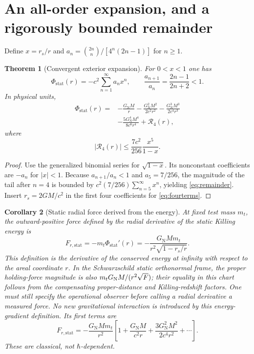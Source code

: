 \documentclass[11pt,a4paper,oneside]{report}
\numberwithin{equation}{chapter}
\newtheorem{theorem}{Theorem}[chapter]
\newtheorem{corollary}[theorem]{Corollary}
\theoremstyle{definition}\newtheorem{definition}[theorem]{Definition}
\theoremstyle{remark}\newtheorem{remark}[theorem]{Remark}
\newcommand{\Phist}{\Phi_{\mathrm{stat}}}
\newcommand{\GNewton}{G_{\mathrm N}}
\begin{document}
\section{An all-order expansion, and a rigorously bounded remainder}\label{sec:series}
Define $x=r_s/r$ and $a_n=\binom{2n}{n}/[4^n(2n-1)]$ for $n\ge1$.
\begin{theorem}[Convergent exterior expansion]\label{thm:series}
For $0<x<1$ one has
\begin{equation}
 \boxed{\displaystyle\Phist(r)=-c^2\sum_{n=1}^\infty a_nx^n},
 \qquad \frac{a_{n+1}}{a_n}=\frac{2n-1}{2n+2}<1.
 \label{eq:allorder}
\end{equation}
In physical units,
\begin{equation}
 \boxed{\begin{aligned}
 \Phist(r)={}&-\frac{\GNewton M}{r}
 -\frac{\GNewton^2M^2}{2c^2r^2}
 -\frac{\GNewton^3M^3}{2c^4r^3}\\
 &-\frac{5\GNewton^4M^4}{8c^6r^4}+\mathcal R_4(r),
 \end{aligned}}
 \label{eq:fourterms}
\end{equation}
where
\begin{equation}
 \boxed{\displaystyle |\mathcal R_4(r)|\leq
 \frac{7c^2}{256}\frac{x^5}{1-x}.}
 \label{eq:remainder}
\end{equation}
\end{theorem}
\begin{proof}
Use the generalized binomial series for $\sqrt{1-x}$. Its nonconstant coefficients are $-a_n$ for $|x|<1$. Because $a_{n+1}/a_n<1$ and $a_5=7/256$, the magnitude of the tail after $n=4$ is bounded by $c^2(7/256)\sum_{n=5}^\infty x^n$, yielding \eqref{eq:remainder}. Insert $r_s=2GM/c^2$ in the first four coefficients for \eqref{eq:fourterms}.
\end{proof}

\begin{corollary}[Static radial force derived from the energy]\label{cor:force}
At fixed test mass $m_t$, the outward-positive force defined by the radial derivative of the static Killing energy is
\begin{equation}
 \boxed{\displaystyle
 F_{r,\mathrm{stat}}=-m_t\Phist'(r)
 =-\frac{\GNewton M m_t}{r^2\sqrt{1-r_s/r}}.}
 \label{eq:staticforce}
\end{equation}
This definition is the derivative of the conserved energy at infinity
with respect to the areal coordinate $r$.  In the Schwarzschild static
orthonormal frame, the proper holding-force magnitude is also
$m_tG_{\rm N}M/(r^2\sqrt F)$; their equality in this chart follows from
the compensating proper-distance and Killing-redshift factors.  One must
still specify the operational observer before calling a radial derivative
a measured force.  No new gravitational interaction is introduced by this
energy-gradient definition.
Its first terms are
\begin{equation}
 F_{r,\mathrm{stat}}=-\frac{\GNewton M m_t}{r^2}
 \left[1+\frac{\GNewton M}{c^2r}
 +\frac{3\GNewton^2M^2}{2c^4r^2}+\cdots\right].
\end{equation}
These are classical, not $\hbar$-dependent.
\end{corollary}
\end{document}
